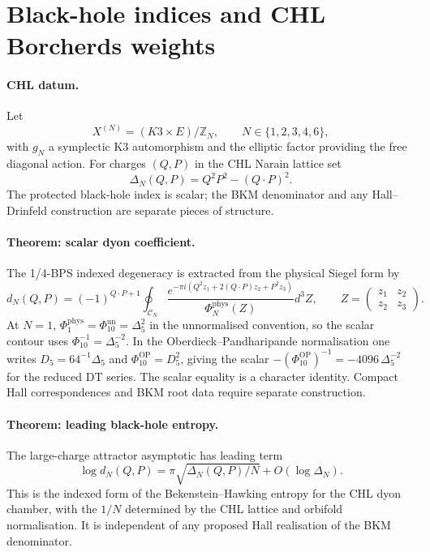 
\providecommand{\kBKM}{\kappa_{\mathrm{BKM}}}
\providecommand{\kch}{\kappa_{\mathrm{ch}}}
\providecommand{\kcat}{\kappa_{\mathrm{cat}}}
\providecommand{\kfib}{\kappa_{\mathrm{fiber}}}
\providecommand{\DBKM}{\Delta^{\mathrm{BKM}}}
\providecommand{\PhiPhys}{\Phi^{\mathrm{phys}}}
\providecommand{\Z}{\mathbb{Z}}
\providecommand{\AdS}{\mathrm{AdS}}
\providecommand{\Tr}{\mathrm{Tr}}

\section*{Black-hole indices and CHL Borcherds weights}
\label{wn:sec:black-hole-indices-chl-borcherds}

\paragraph{CHL datum.}
Let
\[
  X^{(N)}=(K3\times E)/\Z_N,\qquad N\in\{1,2,3,4,6\},
\]
with $g_N$ a symplectic K3 automorphism and the elliptic factor
providing the free diagonal action. For charges $(Q,P)$ in the CHL
Narain lattice set
\[
  \Delta_N(Q,P)=Q^2P^2-(Q\cdot P)^2 .
\]
The protected black-hole index is scalar; the BKM denominator and any
Hall--Drinfeld construction are separate pieces of structure.

\paragraph{Theorem: scalar dyon coefficient.}
The 1/4-BPS indexed degeneracy is extracted from the physical Siegel
form by
\[
d_N(Q,P)=
(-1)^{Q\cdot P+1}
\oint_{\mathcal C_N}
\frac{
e^{-\pi i(Q^2 z_1+2(Q\cdot P)z_2+P^2 z_3)}
}{
\PhiPhys_N(Z)
}
d^3Z ,
\qquad
Z=\begin{pmatrix}z_1&z_2\\ z_2&z_3\end{pmatrix}.
\label{wn:eq:black-hole-scalar-dyon-coefficient}
\]
At $N=1$, $\PhiPhys_1=\Phi_{10}^{\mathrm{un}}=\Delta_5^2$ in the
unnormalised convention, so the scalar contour uses
$\Phi_{10}^{-1}=\Delta_5^{-2}$. In the Oberdieck--Pandharipande
normalisation one writes $D_5=64^{-1}\Delta_5$ and
$\Phi_{10}^{\mathrm{OP}}=D_5^2$, giving the scalar
$-(\Phi_{10}^{\mathrm{OP}})^{-1}=-4096\,\Delta_5^{-2}$ for the reduced
DT series. The scalar equality is a character identity. Compact Hall
correspondences and BKM root data require separate construction.

\paragraph{Theorem: leading black-hole entropy.}
The large-charge attractor asymptotic has leading term
\[
  \log d_N(Q,P)
  =
  \pi\sqrt{\Delta_N(Q,P)/N}+O(\log \Delta_N).
\label{wn:eq:black-hole-leading-entropy}
\]
This is the indexed form of the Bekenstein--Hawking entropy for the
CHL dyon chamber, with the $1/N$ determined by the CHL lattice and
orbifold normalisation. It is independent of any proposed Hall
realisation of the BKM denominator.

